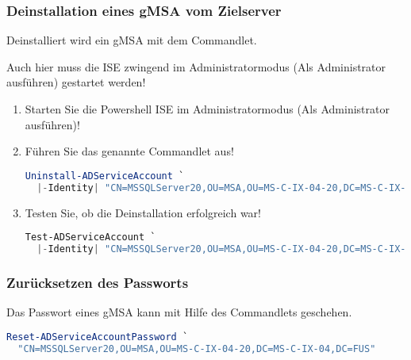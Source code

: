         \subsubsection{Deinstallation eines gMSA vom Zielserver}
          Deinstalliert wird ein gMSA mit dem
           Commandlet.
          \begin{merke}
            Auch hier muss die ISE zwingend im Administratormodus (Als
            Administrator ausführen) gestartet werden!
          \end{merke}
          \begin{enumerate}
              \item Starten Sie die Powershell ISE im Administratormodus (Als
              Administrator ausführen)!
              \item Führen Sie das genannte Commandlet aus!
                \begin{lstlisting}[language=powershell, caption={Einen MSA vom
                Zielserver deinstallieren}, label=uninstall_msa_1]
  Uninstall-ADServiceAccount `
  |-Identity| "CN=MSSQLServer20,OU=MSA,OU=MS-C-IX-04-20,DC=MS-C-IX-04,DC=FUS"
          \end{lstlisting}
              \item Testen Sie, ob die Deinstallation erfolgreich war!
                \begin{lstlisting}[language=powershell, caption={Prüfen des
                Deinstallationserfolges}, label=uninstall_msa_2]
  Test-ADServiceAccount `
  |-Identity| "CN=MSSQLServer20,OU=MSA,OU=MS-C-IX-04-20,DC=MS-C-IX-04,DC=FUS"
                \end{lstlisting}
          \end{enumerate}
          \begin{literaturinternet}
            \item \cite{ee617202}
          \end{literaturinternet}
        \subsubsection{Zurücksetzen des Passworts}
          Das Passwort eines gMSA kann mit Hilfe des Commandlets
           geschehen.
          \begin{lstlisting}[language=powershell, caption={Das Passwort eines
          MSA mauell zurücksetzen}, label=reset_msa_password]
  Reset-ADServiceAccountPassword `
  "CN=MSSQLServer20,OU=MSA,OU=MS-C-IX-04-20,DC=MS-C-IX-04,DC=FUS"
          \end{lstlisting}    
        \begin{literaturinternet}
          \item \cite{dd391923}
          \item \cite{jj128431}
          \item \cite{sqlosteam20140219}
          \item \cite{ee617202}
        \end{literaturinternet}
